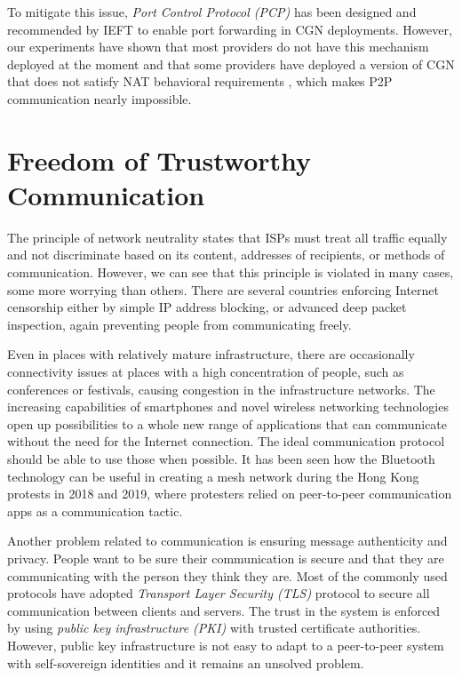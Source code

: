 To mitigate this issue, \textit{Port Control Protocol (PCP)} \cite{pcp} has been designed and recommended by IEFT to enable port forwarding in CGN deployments. However, our experiments have shown that most providers do not have this mechanism deployed at the moment and that some providers have deployed a version of CGN that does not satisfy NAT behavioral requirements \cite{behave}, which makes P2P communication nearly impossible.



\section{Freedom of Trustworthy Communication}

The principle of network neutrality states that ISPs must treat all traffic equally and not discriminate based on its content, addresses of recipients, or methods of communication. However, we can see that this principle is violated in many cases, some more worrying than others. There are several countries enforcing Internet censorship either by simple IP address blocking, or advanced deep packet inspection, again preventing people from communicating freely.

Even in places with relatively mature infrastructure, there are occasionally connectivity issues at places with a high concentration of people, such as conferences or festivals, causing congestion in the infrastructure networks. The increasing capabilities of smartphones and novel wireless networking technologies open up possibilities to a whole new range of applications that can communicate without the need for the Internet connection. The ideal communication protocol should be able to use those when possible. It has been seen how the Bluetooth technology can be useful in creating a mesh network during the Hong Kong protests in 2018 and 2019, where protesters relied on peer-to-peer communication apps as a communication tactic.

Another problem related to communication is ensuring message authenticity and privacy. People want to be sure their communication is secure and that they are communicating with the person they think they are. Most of the commonly used protocols have adopted \textit{Transport Layer Security (TLS)} protocol to secure all communication between clients and servers. The trust in the system is enforced by using \textit{public key infrastructure (PKI)} with trusted certificate authorities. However, public key infrastructure is not easy to adapt to a peer-to-peer system with self-sovereign identities and it remains an unsolved problem.

